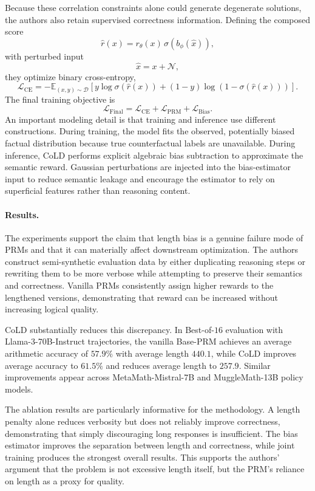 \documentclass[11pt]{article}
\begin{document}
Because these correlation constraints alone could generate degenerate solutions, the authors also retain supervised correctness information. Defining the composed score
\[
\hat{r}(x)
=
r_\theta(x)
\,
\sigma
\left(
b_\phi(\hat{x})
\right),
\]
with perturbed input
\[
\hat{x}=x+\mathcal{N},
\]
they optimize binary cross-entropy,
\[
\mathcal{L}_{\mathrm{CE}}
=
-
\mathbb{E}_{(x,y)\sim\mathcal{D}}
\left[
y\log \sigma(\hat{r}(x))
+
(1-y)\log
\left(
1-\sigma(\hat{r}(x))
\right)
\right].
\]
The final training objective is
\[
\mathcal{L}_{\mathrm{Final}}
=
\mathcal{L}_{\mathrm{CE}}
+
\mathcal{L}_{\mathrm{PRM}}
+
\mathcal{L}_{\mathrm{Bias}}.
\]
An important modeling detail is that training and inference use different constructions. During training, the model fits the observed, potentially biased factual distribution because true counterfactual labels are unavailable. During inference, CoLD performs explicit algebraic bias subtraction to approximate the semantic reward. Gaussian perturbations are injected into the bias-estimator input to reduce semantic leakage and encourage the estimator to rely on superficial features rather than reasoning content.

\paragraph{Results.}
The experiments support the claim that length bias is a genuine failure mode of PRMs and that it can materially affect downstream optimization. The authors construct semi-synthetic evaluation data by either duplicating reasoning steps or rewriting them to be more verbose while attempting to preserve their semantics and correctness. Vanilla PRMs consistently assign higher rewards to the lengthened versions, demonstrating that reward can be increased without increasing logical quality.

CoLD substantially reduces this discrepancy. In Best-of-$16$ evaluation with Llama-3-70B-Instruct trajectories, the vanilla Base-PRM achieves an average arithmetic accuracy of $57.9\%$ with average length $440.1$, while CoLD improves average accuracy to $61.5\%$ and reduces average length to $257.9$. Similar improvements appear across MetaMath-Mistral-7B and MuggleMath-13B policy models.

The ablation results are particularly informative for the methodology. A length penalty alone reduces verbosity but does not reliably improve correctness, demonstrating that simply discouraging long responses is insufficient. The bias estimator improves the separation between length and correctness, while joint training produces the strongest overall results. This supports the authors' argument that the problem is not excessive length itself, but the PRM's reliance on length as a proxy for quality.
\end{document}
